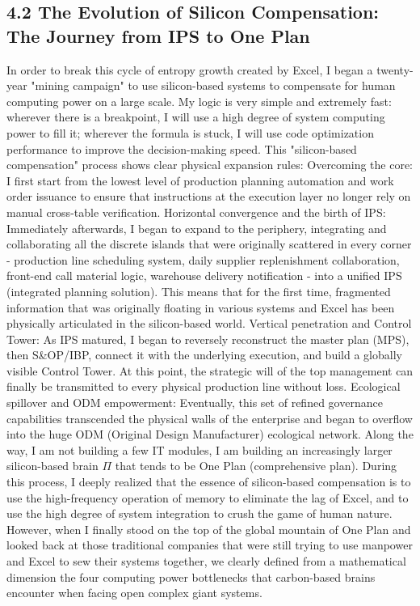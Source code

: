 \documentclass[11pt,a4paper]{article}
\begin{document}
\subsection*{4.2 The Evolution of Silicon Compensation: The Journey from IPS to One Plan}


In order to break this cycle of entropy growth created by Excel, I began a twenty-year "mining campaign" to use silicon-based systems to compensate for human computing power on a large scale. My logic is very simple and extremely fast: wherever there is a breakpoint, I will use a high degree of system computing power to fill it; wherever the formula is stuck, I will use code optimization performance to improve the decision-making speed. This "silicon-based compensation" process shows clear physical expansion rules: Overcoming the core: I first start from the lowest level of production planning automation and work order issuance to ensure that instructions at the execution layer no longer rely on manual cross-table verification. Horizontal convergence and the birth of IPS: Immediately afterwards, I began to expand to the periphery, integrating and collaborating all the discrete islands that were originally scattered in every corner - production line scheduling system, daily supplier replenishment collaboration, front-end call material logic, warehouse delivery notification - into a unified IPS (integrated planning solution). This means that for the first time, fragmented information that was originally floating in various systems and Excel has been physically articulated in the silicon-based world. Vertical penetration and Control Tower: As IPS matured, I began to reversely reconstruct the master plan (MPS), then S\&OP/IBP, connect it with the underlying execution, and build a globally visible Control Tower. At this point, the strategic will of the top management can finally be transmitted to every physical production line without loss. Ecological spillover and ODM empowerment: Eventually, this set of refined governance capabilities transcended the physical walls of the enterprise and began to overflow into the huge ODM (Original Design Manufacturer) ecological network. Along the way, I am not building a few IT modules, I am building an increasingly larger silicon-based brain $\Pi$ that tends to be One Plan (comprehensive plan). During this process, I deeply realized that the essence of silicon-based compensation is to use the high-frequency operation of memory to eliminate the lag of Excel, and to use the high degree of system integration to crush the game of human nature. However, when I finally stood on the top of the global mountain of One Plan and looked back at those traditional companies that were still trying to use manpower and Excel to sew their systems together, we clearly defined from a mathematical dimension the four computing power bottlenecks that carbon-based brains encounter when facing open complex giant systems.
\end{document}
